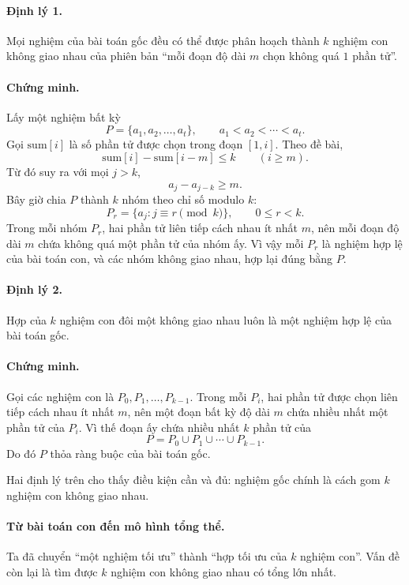 \documentclass[11pt]{article}
\begin{document}
\paragraph{Định lý 1.}
Mọi nghiệm của bài toán gốc đều có thể được phân hoạch thành \(k\) nghiệm con
không giao nhau của phiên bản ``mỗi đoạn độ dài \(m\) chọn không quá \(1\)
phần tử''.

\paragraph{Chứng minh.}
Lấy một nghiệm bất kỳ
\[
  P=\{a_1,a_2,\ldots,a_t\},\qquad
  a_1<a_2<\cdots<a_t.
\]
Gọi \(\mathrm{sum}[i]\) là số phần tử được chọn trong đoạn \([1,i]\). Theo đề
bài,
\[
  \mathrm{sum}[i]-\mathrm{sum}[i-m]\le k \qquad (i\ge m).
\]
Từ đó suy ra với mọi \(j>k\),
\[
  a_j-a_{j-k}\ge m.
\]
Bây giờ chia \(P\) thành \(k\) nhóm theo chỉ số modulo \(k\):
\[
  P_r=\{a_j: j\equiv r \pmod k\},\qquad 0\le r<k.
\]
Trong mỗi nhóm \(P_r\), hai phần tử liên tiếp cách nhau ít nhất \(m\), nên mỗi
đoạn độ dài \(m\) chứa không quá một phần tử của nhóm ấy. Vì vậy mỗi \(P_r\)
là nghiệm hợp lệ của bài toán con, và các nhóm không giao nhau, hợp lại đúng
bằng \(P\).

\paragraph{Định lý 2.}
Hợp của \(k\) nghiệm con đôi một không giao nhau luôn là một nghiệm hợp lệ của
bài toán gốc.

\paragraph{Chứng minh.}
Gọi các nghiệm con là \(P_0,P_1,\ldots,P_{k-1}\). Trong mỗi \(P_i\), hai phần
tử được chọn liên tiếp cách nhau ít nhất \(m\), nên một đoạn bất kỳ độ dài
\(m\) chứa nhiều nhất một phần tử của \(P_i\). Vì thế đoạn ấy chứa nhiều nhất
\(k\) phần tử của
\[
  P=P_0\cup P_1\cup\cdots\cup P_{k-1}.
\]
Do đó \(P\) thỏa ràng buộc của bài toán gốc.

Hai định lý trên cho thấy điều kiện cần và đủ: nghiệm gốc chính là cách gom
\(k\) nghiệm con không giao nhau.

\paragraph{Từ bài toán con đến mô hình tổng thể.}
Ta đã chuyển ``một nghiệm tối ưu'' thành ``hợp tối ưu của \(k\) nghiệm con''.
Vấn đề còn lại là tìm được \(k\) nghiệm con không giao nhau có tổng lớn nhất.
\end{document}
